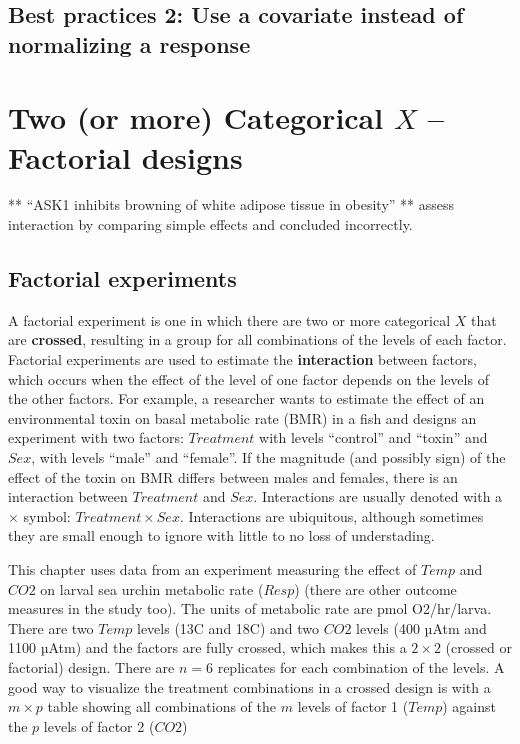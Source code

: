\documentclass[]{book}
\begin{document}
\hypertarget{best-practices-2-use-a-covariate-instead-of-normalizing-a-response}{%
\section{Best practices 2: Use a covariate instead of normalizing a response}\label{best-practices-2-use-a-covariate-instead-of-normalizing-a-response}}

\hypertarget{two-or-more-categorical-x-factorial-designs}{%
\chapter{\texorpdfstring{Two (or more) Categorical \(X\) -- Factorial designs}{Two (or more) Categorical X -- Factorial designs}}\label{two-or-more-categorical-x-factorial-designs}}

** ``ASK1 inhibits browning of white adipose tissue in obesity'' ** assess interaction by comparing simple effects and concluded incorrectly.

\hypertarget{factorial-experiments}{%
\section{Factorial experiments}\label{factorial-experiments}}

A factorial experiment is one in which there are two or more categorical \(X\) that are \textbf{crossed}, resulting in a group for all combinations of the levels of each factor. Factorial experiments are used to estimate the \textbf{interaction} between factors, which occurs when the effect of the level of one factor depends on the levels of the other factors. For example, a researcher wants to estimate the effect of an environmental toxin on basal metabolic rate (BMR) in a fish and designs an experiment with two factors: \(Treatment\) with levels ``control'' and ``toxin'' and \(Sex\), with levels ``male'' and ``female''. If the magnitude (and possibly sign) of the effect of the toxin on BMR differs between males and females, there is an interaction between \(Treatment\) and \(Sex\). Interactions are usually denoted with a \(\times\) symbol: \(Treatment \times Sex\). Interactions are ubiquitous, although sometimes they are small enough to ignore with little to no loss of understading.

This chapter uses data from an experiment measuring the effect of \(Temp\) and \(CO2\) on larval sea urchin metabolic rate (\(Resp\)) (there are other outcome measures in the study too). The units of metabolic rate are pmol O2/hr/larva. There are two \(Temp\) levels (13C and 18C) and two \(CO2\) levels (400 µAtm and 1100 µAtm) and the factors are fully crossed, which makes this a \(2 \times 2\) (crossed or factorial) design. There are \(n=6\) replicates for each combination of the levels. A good way to visualize the treatment combinations in a crossed design is with a \(m \times p\) table showing all combinations of the \(m\) levels of factor 1 (\(Temp\)) against the \(p\) levels of factor 2 (\(CO2\))
\end{document}
